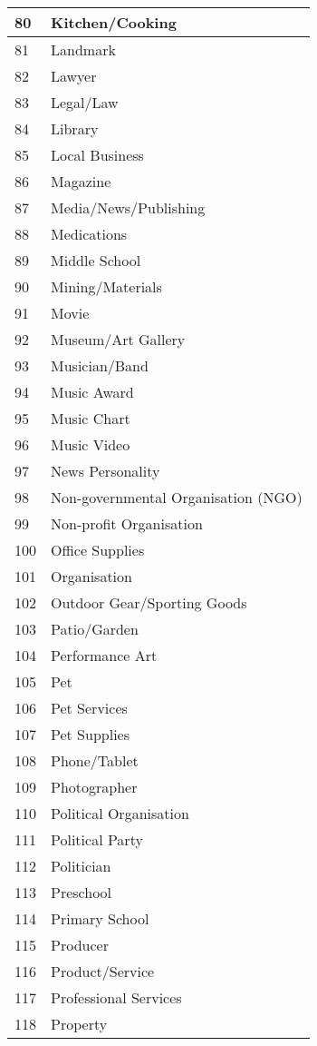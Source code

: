 \begin{longtable}{|p{1cm}|p{4in}|}
80&Kitchen/Cooking \\ \hline
81&Landmark \\ \hline
82&Lawyer \\ \hline
83&Legal/Law \\ \hline
84&Library \\ \hline
85&Local Business \\ \hline
86&Magazine \\ \hline
87&Media/News/Publishing \\ \hline
88&Medications \\ \hline
89&Middle School \\ \hline
90&Mining/Materials \\ \hline
91&Movie \\ \hline
92&Museum/Art Gallery \\ \hline
93&Musician/Band \\ \hline
94&Music Award \\ \hline
95&Music Chart \\ \hline
96&Music Video \\ \hline
97&News Personality \\ \hline
98&Non-governmental Organisation (NGO) \\ \hline
99&Non-profit Organisation \\ \hline
100&Office Supplies \\ \hline
101&Organisation \\ \hline
102&Outdoor Gear/Sporting Goods \\ \hline
103&Patio/Garden \\ \hline
104&Performance Art \\ \hline
105&Pet \\ \hline
106&Pet Services \\ \hline
107&Pet Supplies \\ \hline
108&Phone/Tablet \\ \hline
109&Photographer \\ \hline
110&Political Organisation \\ \hline
111&Political Party \\ \hline
112&Politician \\ \hline
113&Preschool \\ \hline
114&Primary School \\ \hline
115&Producer \\ \hline
116&Product/Service \\ \hline
117&Professional Services \\ \hline
118&Property \\ \hline

\end{longtable}
